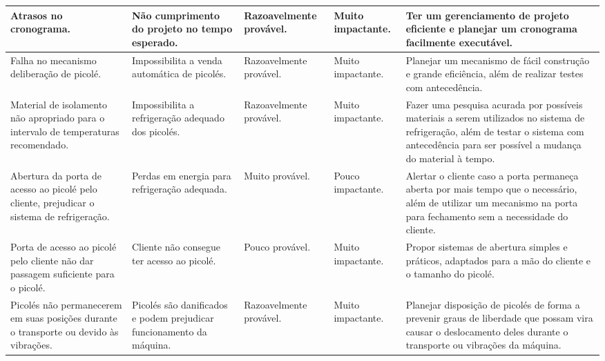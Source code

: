 \begin{longtable}{|m{2cm}|m{3cm}|m{2.8cm}|m{3cm}|m{4cm}|}
Atrasos no cronograma.                                                                              & Não cumprimento do projeto no tempo esperado.                            & Razoavelmente provável. & Muito impactante.         & Ter um gerenciamento de projeto eficiente e planejar um cronograma facilmente executável.                                                                                                                            \\ \hline
Falha no mecanismo deliberação de picolé.                                                      & Impossibilita a venda automática de picolés.                             & Razoavelmente provável. & Muito impactante.        & Planejar um mecanismo de fácil construção e grande eficiência, além de realizar testes com antecedência.                                                                                                         \\ \hline
Material de isolamento não apropriado para o intervalo de temperaturas recomendado.      & Impossibilita a refrigeração adequado dos picolés.                    & Razoavelmente provável. & Muito impactante.         & Fazer uma pesquisa acurada por possíveis materiais a serem utilizados no sistema de refrigeração, além de testar o sistema com antecedência para ser  possível a mudança do material à tempo.             \\ \hline
Abertura da porta de acesso ao picolé pelo cliente, prejudicar o sistema de refrigeração. & Perdas em energia para refrigeração adequada.                         & Muito provável.         & Pouco impactante.         & Alertar o cliente caso a porta permaneça aberta por mais tempo que o necessário, além de utilizar um mecanismo na porta para fechamento sem a necessidade do cliente.                                    \\ \hline
Porta de acesso ao picolé pelo cliente não dar passagem suficiente para o picolé.              & Cliente não consegue ter acesso ao picolé.                              & Pouco provável.         & Muito impactante.         & Propor sistemas de abertura simples e práticos, adaptados para a mão do cliente e o tamanho do picolé.                                                                                                            \\ \hline
Picolés não permanecerem em suas posições durante o transporte ou devido às vibrações.    & Picolés são danificados e podem prejudicar funcionamento da máquina. & Razoavelmente provável. & Muito impactante.         & Planejar disposição de picolés de forma a prevenir graus de liberdade que possam vira causar o deslocamento deles durante o transporte ou vibrações da máquina.                                                 \\ \hline

\end{longtable}
